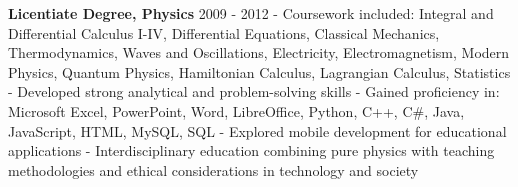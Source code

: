 \documentclass[
]{article}
\begin{document}
\textbf{Licentiate Degree, Physics} \textbar{} 2009 - 2012 - Coursework
included: Integral and Differential Calculus I-IV, Differential
Equations, Classical Mechanics, Thermodynamics, Waves and Oscillations,
Electricity, Electromagnetism, Modern Physics, Quantum Physics,
Hamiltonian Calculus, Lagrangian Calculus, Statistics - Developed strong
analytical and problem-solving skills - Gained proficiency in: Microsoft
Excel, PowerPoint, Word, LibreOffice, Python, C++, C\#, Java,
JavaScript, HTML, MySQL, SQL - Explored mobile development for
educational applications - Interdisciplinary education combining pure
physics with teaching methodologies and ethical considerations in
technology and society
\end{document}
